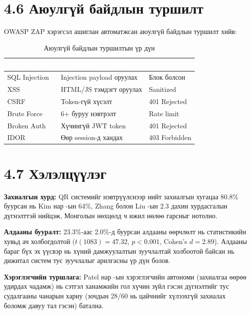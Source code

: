 \section{4.6 Аюулгүй байдлын туршилт}

OWASP ZAP хэрэгсэл ашиглан автоматжсан аюулгүй байдлын туршилт хийв:

\begin{table}[htbp]
\caption{Аюулгүй байдлын туршилтын үр дүн}
\label{tab:security}
\centering
\begin{tabularx}{\textwidth}{|X|X|Z|}
\hline
{}\textcolor{white}{\textbf{Аюулын төрөл}}
  & \textcolor{white}{\textbf{Туршилтын аргачлал}}
  & \textcolor{white}{\textbf{Үр дүн}} \\ \hline
SQL Injection  & Injection payload оруулах  & Блок болсон \\ \hline
XSS            & HTML/JS тэмдэгт оруулах   & Sanitized \\ \hline
CSRF           & Token-гүй хүсэлт          & 401 Rejected \\ \hline
Brute Force    & 6+ буруу нэвтрэлт         & Rate limit \\ \hline
Broken Auth    & Хүчингүй JWT token         & 401 Rejected \\ \hline
IDOR           & Өөр session-д хандах       & 403 Forbidden \\ \hline
\end{tabularx}
\end{table}

\section{4.7 Хэлэлцүүлэг}

\textbf{Захиалгын хурд:} QR системийг нэвтрүүлснээр нийт захиалгын хугацаа 80.8\%
буурсан нь Kim нар \cite{kim2023}-ын 64\%, Zhang болон Liu \cite{zhang2022}-ын 2.3 дахин
хурдасгалын дүгнэлттэй нийцэж, Монголын нөхцөлд ч ижил нөлөө гарсныг нотолно.

\textbf{Алдааны бууралт:} 23.3\%-аас 2.0\%-д буурсан алдааны өөрчлөлт нь статистикийн
хувьд ач холбогдолтой ($t(1083) = 47.32$, $p < 0.001$, Cohen's $d = 2.89$). Алдааны
бараг бүх эх үүсвэр нь хүний дамжуулалтын зуучлалтай холбоотой байсан нь дижитал
систем тус зуучлалыг арилгасны үр дүн болов.

\textbf{Хэрэглэгчийн туршлага:} Patel нар \cite{patel2022}-ын хэрэглэгчийн автономи
(захиалгаа өөрөө удирдах чадамж) нь сэтгэл ханамжийн гол хүчин зүйл гэсэн
дүгнэлтийг тус судалгааны чанарын хариу (зочдын 28/60 нь цайчнийг хүлээхгүй
захиалах боломж давуу тал гэсэн) батална.
